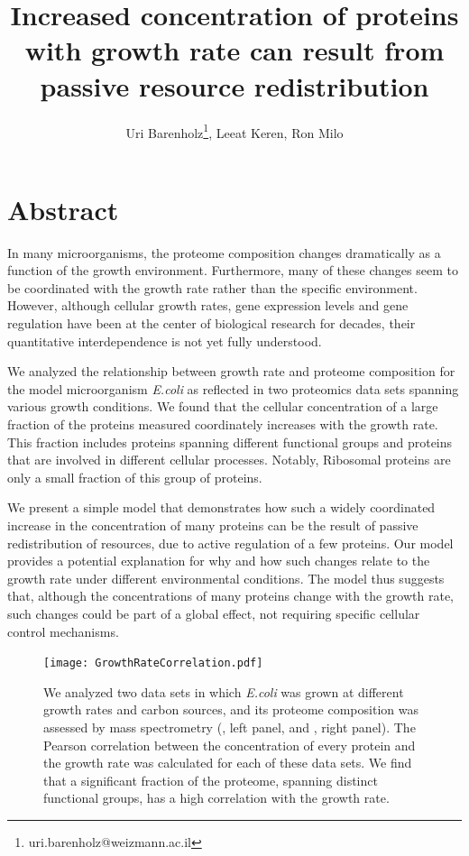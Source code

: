 \documentclass[a4paper,landscape,17pt]{extarticle}
\title{\Huge Increased concentration of proteins with growth rate can result from passive resource redistribution}
\author{\Large Uri Barenholz\thanks{uri.barenholz@weizmann.ac.il}, Leeat Keren, Ron Milo}
\affil{Weizmann Institute of Science, Rehovot, Israel}
\date{}
\begin{document}
\maketitle
\clearpage
\section*{\LARGE Abstract}
In many microorganisms, the proteome composition changes dramatically as a function of the growth environment.
Furthermore, many of these changes seem to be coordinated with the growth rate rather than the specific environment.
However, although cellular growth rates, gene expression levels and gene regulation have been at the center of biological research for decades, their quantitative interdependence is not yet fully understood.

We analyzed the relationship between growth rate and proteome composition for the model microorganism \emph{E.coli} as reflected in two proteomics data sets spanning various growth conditions.
We found that the cellular concentration of a large fraction of the proteins measured coordinately increases with the growth rate.
This fraction includes proteins spanning different functional groups and proteins that are involved in different cellular processes.
Notably, Ribosomal proteins are only a small fraction of this group of proteins.

We present a simple model that demonstrates how such a widely coordinated increase in the concentration of many proteins can be the result of passive redistribution of resources, due to active regulation of a few proteins.
Our model provides a potential explanation for why and how such changes relate to the growth rate under different environmental conditions.
The model thus suggests that, although the concentrations of many proteins change with the growth rate, such changes could be part of a global effect, not requiring specific cellular control mechanisms.
\clearpage        

\begin{figure}[h]
\centering
\texttt{[image: GrowthRateCorrelation.pdf]}
\caption{\linespread{0.5}\selectfont{}
  We analyzed two data sets in which \emph{E.coli} was grown at different growth rates and carbon sources, and its proteome composition was assessed by mass spectrometry (\parencite{Heinemann2014}, left panel, and \parencite{Valgepea2013}, right panel).
The Pearson correlation between the concentration of every protein and the growth rate was calculated for each of these data sets.
We find that a significant fraction of the proteome, spanning distinct functional groups, has a high correlation with the growth rate.
}
\label{fig:growthcorr}
\end{figure}
\end{document}
